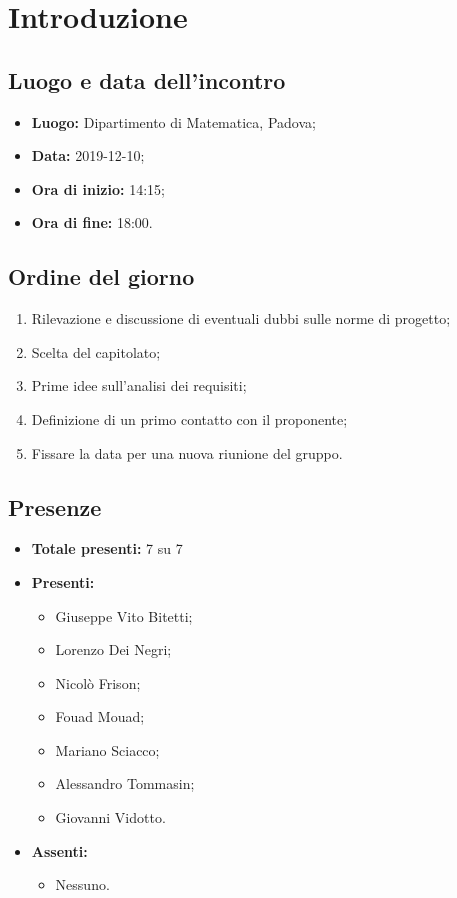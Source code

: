 \section*{Introduzione}

\subsection*{Luogo e data dell'incontro}
	\begin{itemize}
		\item \textbf{Luogo:} Dipartimento di Matematica, Padova;
		\item \textbf{Data:} 2019-12-10;
		\item \textbf{Ora di inizio:} 14:15;
		\item \textbf{Ora di fine:} 18:00.
	\end{itemize}

\subsection*{Ordine del giorno}
	\begin{enumerate}
		\item Rilevazione e discussione di eventuali dubbi sulle norme di progetto;
		\item Scelta del capitolato;
		\item Prime idee sull'analisi dei requisiti;
		\item Definizione di un primo contatto con il proponente;
		\item Fissare la data per una nuova riunione del gruppo.
	\end{enumerate}

\subsection*{Presenze}
	\begin{itemize}
		\item \textbf{Totale presenti:} 7 su 7
		\item \textbf{Presenti: }
			\begin{itemize}			
				\item Giuseppe Vito Bitetti;
				\item Lorenzo Dei Negri;
				\item Nicolò Frison;
				\item Fouad Mouad;
				\item Mariano Sciacco;
				\item Alessandro Tommasin;
				\item Giovanni Vidotto.
			\end{itemize}
		\item \textbf{Assenti: } 
			\begin{itemize}	
				\item Nessuno.
			\end{itemize}
	\end{itemize}


